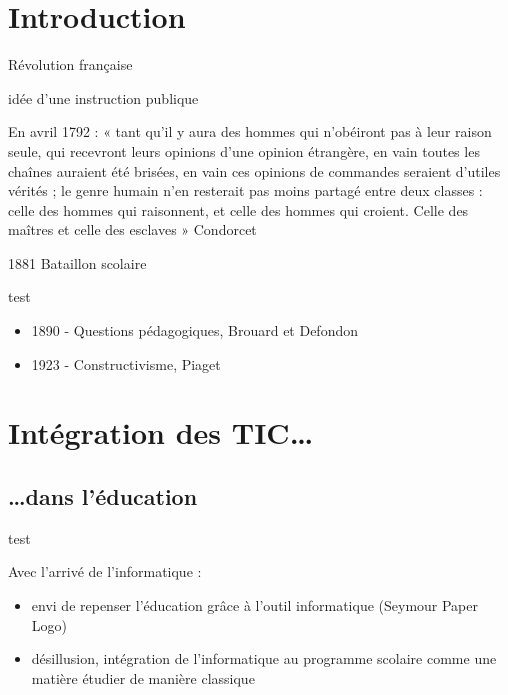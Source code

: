 
\section{Introduction}

\begin{frame}{Révolution française}

idée d'une instruction publique


En avril 1792 :
« tant qu'il y aura des hommes qui n'obéiront pas à leur raison seule, 
qui recevront leurs opinions d'une opinion étrangère, en vain toutes 
les chaînes auraient été brisées, en vain ces opinions de commandes 
seraient d'utiles vérités ; le genre humain n'en resterait pas moins 
partagé entre deux classes : celle des hommes qui raisonnent, et celle 
des hommes qui croient. Celle des maîtres et celle des esclaves »
Condorcet

\end{frame}

\begin{frame}{1881 Bataillon scolaire}
\end{frame}

\begin{frame}{test}
  \begin{itemize}
  \item 1890 - Questions pédagogiques, Brouard et Defondon
  \item 1923 - Constructivisme, Piaget
  \end{itemize}
\end{frame}

\section{Intégration des TIC\ldots}

\subsection{\ldots dans l'éducation}

\begin{frame}{test}

Avec l'arrivé de l'informatique :
\begin{itemize}
\item envi de repenser l'éducation grâce à l'outil informatique (Seymour Paper Logo)
\item désillusion, intégration de l'informatique au programme scolaire comme une matière étudier de manière classique
\end{itemize}

\end{frame}



